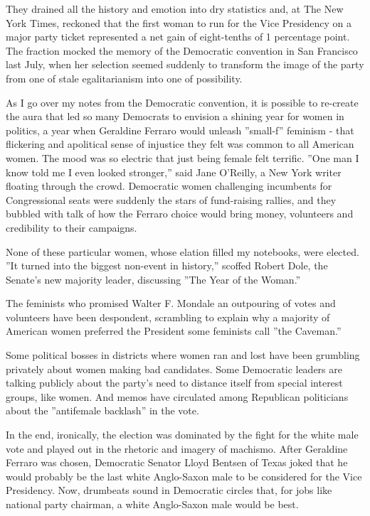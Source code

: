 They drained all the history and emotion into dry statistics and, at The
New York Times, reckoned that the first woman to run for the Vice
Presidency on a major party ticket represented a net gain of
eight-tenths of 1 percentage point. The fraction mocked the memory of
the Democratic convention in San Francisco last July, when her selection
seemed suddenly to transform the image of the party from one of stale
egalitarianism into one of possibility.

As I go over my notes from the Democratic convention, it is possible to
re-create the aura that led so many Democrats to envision a shining year
for women in politics, a year when Geraldine Ferraro would unleash
''small-f'' feminism - that flickering and apolitical sense of injustice
they felt was common to all American women. The mood was so electric
that just being female felt terrific. ''One man I know told me I even
looked stronger,'' said Jane O'Reilly, a New York writer floating
through the crowd. Democratic women challenging incumbents for
Congressional seats were suddenly the stars of fund-raising rallies, and
they bubbled with talk of how the Ferraro choice would bring money,
volunteers and credibility to their campaigns.

None of these particular women, whose elation filled my notebooks, were
elected. ''It turned into the biggest non-event in history,'' scoffed
Robert Dole, the Senate's new majority leader, discussing ''The Year of
the Woman.''

The feminists who promised Walter F. Mondale an outpouring of votes and
volunteers have been despondent, scrambling to explain why a majority of
American women preferred the President some feminists call ''the
Caveman.''

Some political bosses in districts where women ran and lost have been
grumbling privately about women making bad candidates. Some Democratic
leaders are talking publicly about the party's need to distance itself
from special interest groups, like women. And memos have circulated
among Republican politicians about the ''antifemale backlash'' in the
vote.

In the end, ironically, the election was dominated by the fight for the
white male vote and played out in the rhetoric and imagery of machismo.
After Geraldine Ferraro was chosen, Democratic Senator Lloyd Bentsen of
Texas joked that he would probably be the last white Anglo-Saxon male to
be considered for the Vice Presidency. Now, drumbeats sound in
Democratic circles that, for jobs like national party chairman, a white
Anglo-Saxon male would be best.

